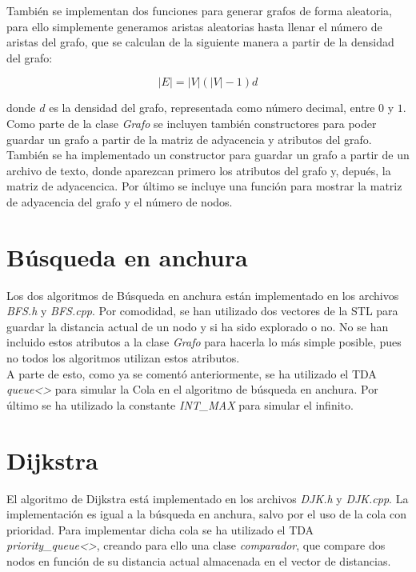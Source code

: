 También se implementan dos funciones para generar grafos de forma aleatoria, para ello simplemente generamos aristas aleatorias hasta llenar el número de aristas del grafo, que se calculan de la siguiente manera a partir de la densidad del grafo:

$$|E| = |V|(|V| - 1)d$$

donde $d$ es la densidad del grafo, representada como número decimal, entre $0$ y $1$. \\

Como parte de la clase \textit{Grafo} se incluyen también constructores para poder guardar un grafo a partir de la matriz de adyacencia y atributos del grafo. También se ha implementado un constructor para guardar un grafo a partir de un archivo de texto, donde aparezcan primero los atributos del grafo y, depués, la matriz de adyacencica. Por último se incluye una función para mostrar la matriz de adyacencia del grafo y el número de nodos.

\section{Búsqueda en anchura}

Los dos algoritmos de Búsqueda en anchura están implementado en los archivos \textit{BFS.h} y \textit{BFS.cpp}. Por comodidad, se han utilizado dos vectores de la STL para guardar la distancia actual de un nodo y si ha sido explorado o no. No se han incluido estos atributos a la clase \textit{Grafo} para hacerla lo más simple posible, pues no todos los algoritmos utilizan estos atributos. \\

A parte de esto, como ya se comentó anteriormente, se ha utilizado el TDA \textit{queue<>} para simular la Cola en el algoritmo de búsqueda en anchura. Por último se ha utilizado la constante \textit{INT\_MAX} para simular el infinito.

\section{Dijkstra}

El algoritmo de Dijkstra está implementado en los archivos \textit{DJK.h} y \textit{DJK.cpp}. La implementación es igual a la búsqueda en anchura, salvo por el uso de la cola con prioridad. Para implementar dicha cola se ha utilizado el TDA \textit{priority\_queue<>}, creando para ello una clase \textit{comparador}, que compare dos nodos en función de su distancia actual almacenada en el vector de distancias.


